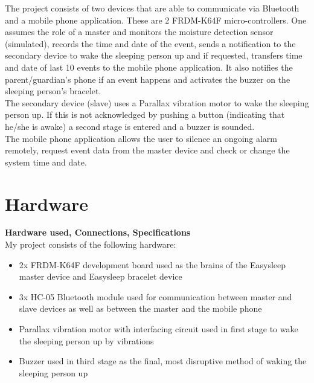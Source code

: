 \documentclass[12pt,a4paper]{article}
\begin{document}
	
	The project consists of two devices that are able to communicate via Bluetooth and a mobile phone application. These are 2 FRDM-K64F micro-controllers. One assumes the role of a master and 
	monitors the moisture detection sensor (simulated), records the time and date of the event, sends a notification to the secondary device to wake the sleeping person up and if requested, 
	transfers time and date of last 10 events to the mobile phone application. It also notifies the 
	parent/guardian's phone if an event happens and activates the buzzer on the sleeping 
	person's bracelet.\\
	
	The secondary device (slave) uses a Parallax vibration motor to wake the sleeping person up. 
	If this is not acknowledged by pushing a button (indicating that he/she is awake) a second stage is entered and a buzzer is sounded.\\
	
	The mobile phone application allows the user to silence an ongoing alarm remotely, request 
	event data from the master device and check or change the system time and date.\\
	\newpage
	
	\section{Hardware}
	{\bfseries Hardware used, Connections, Specifications}\\
	
	My project consists of the following hardware:
	
	\begin{itemize}
	 \item 2x FRDM-K64F development board used as the brains of the Easysleep master device and Easysleep bracelet device
	 \item 3x HC-05 Bluetooth module used for communication between master and slave devices as well as between the master and the mobile phone
	 \item Parallax vibration motor with interfacing circuit used in first stage to wake the sleeping person up by vibrations
	 \item Buzzer used in third stage as the final, most disruptive method of waking the sleeping  person up
	\end{itemize}
\end{document}

